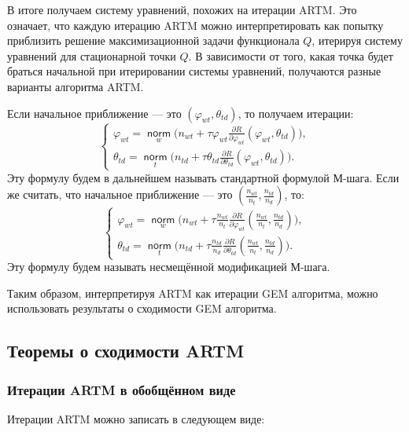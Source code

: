 \documentclass[12pt]{article}
\renewcommand{\phi}{\varphi}
\newcommand{\norm}{\mathop{\mathsf{norm}}\limits}
\begin{document}
В итоге получаем систему уравнений, похожих на итерации ARTM. Это означает, что каждую итерацию ARTM можно интерпретировать как попытку приблизить решение максимизационной задачи функционала $Q$, итерируя систему уравнений для стационарной точки $Q$. В зависимости от того, какая точка будет браться начальной при итерировании системы уравнений, получаются разные варианты алгоритма ARTM.

Если начальное приближение --- это $(\phi_{wt}, \theta_{td})$, то получаем итерации:
\begin{equation}
\label{eq:artm_original}
\left\{
	\begin{aligned}
		\phi_{wt} = \norm_w \bigg( n_{wt} + \tau\phi_{wt} \frac{\partial{R}}{\partial{\phi_{wt}}} \left( \phi_{wt}, \theta_{td}\right) \bigg),\\
		\theta_{td} = \norm_t \bigg( n_{td} + \tau\theta_{td} \frac{\partial{R}}{\partial{\theta_{td}}} \left( \phi_{wt}, \theta_{td}\right) \bigg).
	\end{aligned}
\right.
\end{equation}
Эту формулу будем в дальнейшем называть стандартной формулой М-шага. Если же считать, что начальное приближение ---  это $\left(\frac{n_{wt}}{n_t}, \frac{n_{td}}{n_d}\right)$, то:
\begin{equation}
\label{eq:artm_unbiased}
\left\{
	\begin{aligned}
		\phi_{wt}= \norm_w \bigg( n_{wt} + \tau \frac{n_{wt}}{n_t} \frac{\partial{R}}{\partial{\phi_{wt}}} \left(\frac{n_{wt}}{n_t}, \frac{n_{td}}{n_d}\right) \bigg),\\
		\theta_{td} = \norm_t \bigg(n_{td} + \tau \frac{n_{td}}{n_d} \frac{\partial{R}}{\partial{\theta_{td}}} \left(\frac{n_{wt}}{n_t}, \frac{n_{td}}{n_d}\right) \bigg).
	\end{aligned}
\right.
\end{equation}
Эту формулу будем называть несмещённой модификацией М-шага.

 Таким образом, интерпретируя ARTM как итерации GEM алгоритма, можно использовать результаты о сходимости GEM алгоритма.
	\subsection{Теоремы о сходимости ARTM }
	\subsubsection{Итерации ARTM в обобщённом виде}
\label{artm_general}  
Итерации ARTM можно записать в следующем виде: 
\end{document}
